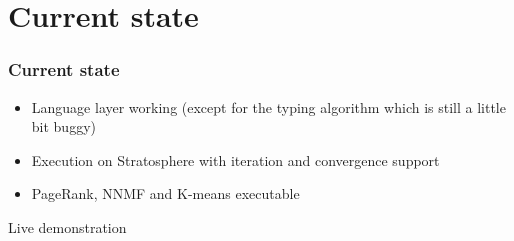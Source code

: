 \section{Current state}

\begin{frame}
	\frametitle{Current state}
	\begin{itemize}
		\item Language layer working (except for the typing algorithm which is still a little bit buggy)
		\item Execution on Stratosphere with iteration and convergence support
		\item PageRank, NNMF and K-means executable
	\end{itemize}
\end{frame}

\begin{frame}
	Live demonstration
\end{frame}